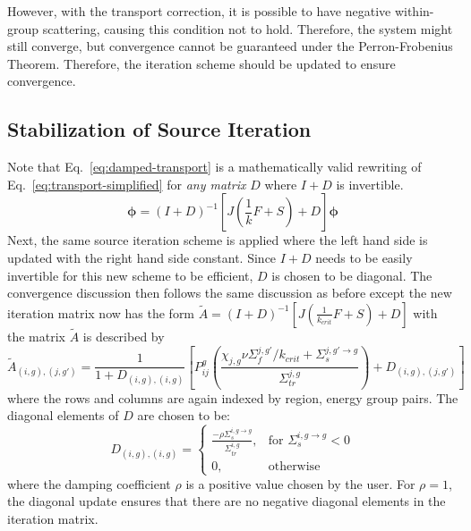 However, with the transport correction, it is possible to have negative within-group scattering, causing this condition not to hold. Therefore, the system might still converge, but convergence cannot be guaranteed under the Perron-Frobenius Theorem. Therefore, the iteration scheme should be updated to ensure convergence. 

\subsection{Stabilization of Source Iteration}
\label{sec:diagonal-stabilization}

Note that Eq.~\ref{eq:damped-transport} is a mathematically valid rewriting of Eq.~\ref{eq:transport-simplified} for \textit{any matrix} $D$ where $I+D$ is invertible. 
\begin{equation}
	\boldsymbol{\phi} = (I+D)^{-1} \left[J \left(\frac{1}{k} F + S \right) + D \right]\boldsymbol{\phi}
	\label{eq:damped-transport}
\end{equation}
Next, the same source iteration scheme is applied where the left hand side is updated with the right hand side constant. Since $I+D$ needs to be easily invertible for this new scheme to be efficient, $D$ is chosen to be diagonal. The convergence discussion then follows the same discussion as before except the new iteration matrix  now has the form $\tilde{A} = (I+D)^{-1} \left[ J \left(\frac{1}{k_{\textit{crit}}} F + S \right) + D \right]$  with the matrix $\tilde{A}$ is described by
\begin{equation}
	\tilde{A}_{(i,g), (j, g')} = \frac{1}{1 + D_{(i,g), (i,g)}}\left[P_{ij}^g \left(\frac{\chi_{j,g} \nu\Sigma_{f}^{j,g'} / k_{\textit{crit}} + \Sigma_{s}^{j,g' \rightarrow g}}{\Sigma_{\textit{tr}}^{j, g}}\right) + D_{(i,g), (j, g')}\right]
	\label{eq:a-tilde}
\end{equation}
where the rows and columns are again indexed by region, energy group pairs. The diagonal elements of $D$ are chosen to be:
\begin{equation}
	D_{(i,g), (i,g)} = \left\{\begin{array}{lr}
		\frac{-\rho \Sigma_{s}^{i,g \rightarrow g}}{\Sigma_{\textit{tr}}^{i, g}} , & \text{for } \Sigma_{s}^{i, g \rightarrow g} < 0\\
		0, & \text{otherwise}
	\end{array}\right.
	\label{eq:d-matrix}
\end{equation}
where the damping coefficient $\rho$ is a positive value chosen by the user. For $\rho = 1$, the diagonal update ensures that there are no negative diagonal elements in the iteration matrix. 

